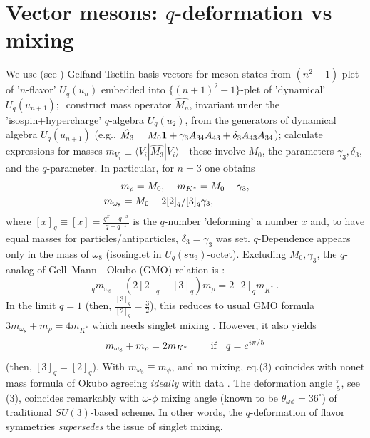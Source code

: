 \documentclass[twoside]{article}
\begin{document}
\section{Vector mesons: $q$-deformation vs mixing}

We use (see    \cite{ga-ser,ga-bre,ga-uzh})  Gelfand-Tsetlin basis
vectors for meson states from $(n^2\!-\!1)$-plet of '$n$-flavor'
$U_q(u_n)$ embedded into $\{(n\!+\!1)^2\!-\!1\}$-plet of
'dynamical' $U_q(u_{n+1});\ $ construct mass operator $\hat {M_n}$,
invariant under the 'isospin+hypercharge' $q$-algebra $U_q(u_2)$,
from the generators of dynamical algebra $U_q(u_{n+1})$
(e.g., $\hat {M_3} = M_0{\bf 1}+{\gamma}_3 A_{34}A_{43}
+{\delta}_3 A_{43}A_{34}$);  calculate expressions for masses
$m_{V_i}\equiv\langle V_i|\hat{M_3}|V_i\rangle $ -
these involve $M_0$, the parameters $\gamma_3, {\delta}_3$,
and the $q$-parameter.
In particular, for $n=3$ one obtains
\vspace{-1.0mm}
\begin{eqnarray}
{} & m_{\rho}=M_0,  \hspace{4mm}  m_{K^*}=M_0 -{\gamma}_3,
                                        \nonumber \\
{} & \hspace{-6mm}
m_{{\omega}_8}= M_0 - 2 {[2]_q}/{[3]_q} {\gamma}_3,     \label{(1)}
\end{eqnarray}
where $[x]_q \equiv[x]= \frac{q^x - q^{-x}}{q - q^{-1}}$ is
the $q$-number 'deforming' a number $x$ and, to have equal masses
for particles/antiparticles, $\delta_3\!=\!\gamma_3$ was set.
$q$-Dependence appears only in the mass of ${\omega }_8$ (isosinglet
in $U_q(su_3)$-octet).  Excluding $M_0, \gamma_3$, the $q$-analog of
Gell--Mann - Okubo (GMO) relation is      \cite{ga-ser} :
\vspace{-1.0mm}
\begin{equation}
[3]_q m_{{\omega }_8} + (2[2]_q-[3]_q) m_{\rho }
                    =  2[2]_q m_{K^*}\ .               \label{(2)}
\end{equation}
In the limit $q\!=\!1$ (then, $\frac{[3]_q}{[2]_q}=\frac32$),
this reduces to
usual GMO formula $3m_{{\omega}_8}\!+\! m_{\rho} = 4 m_{K^*}$
which needs singlet mixing                                \cite{8-fold}.
However, it also yields
\begin{equation} m_{{\omega}_8} + m_{\rho} = 2 m_{K^*}
               \hspace{8mm}  {\rm if}  \hspace{3mm}   q=e^{i\pi /5}                                   \label{(3)}
\end{equation}
(then,  $[3]_q=[2]_q$).
With $m_{{\omega}_8}\equiv m_{\phi}$, and no mixing, eq.(3) coincides
with nonet mass formula of Okubo  \cite{oku-fi} agreeing {\it ideally}
with data  \cite{PDG}.
%
The deformation angle $\frac{\pi}{5}$, see (3), coincides remarkably
with $\omega$-$\phi$ mixing angle (known  \cite{PDG}
to be $\theta_{\omega\phi}=36^{\circ}$) of traditional
$SU(3)$-based scheme. In other words, the $q$-deformation of flavor
symmetries {\em supersedes} the issue of singlet mixing.
\end{document}
